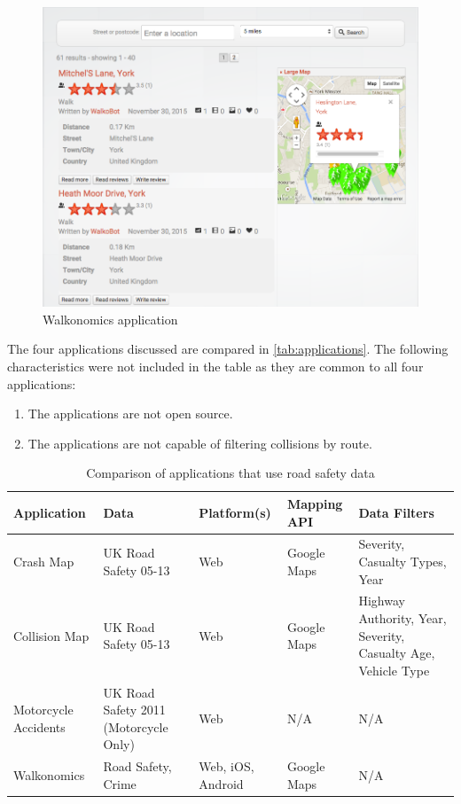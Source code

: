 \documentclass[authoryearcitations]{UoYCSproject}
\begin{document}
\begin{figure}
	\center
	\includegraphics[scale=0.4]{walkonomics}
	\caption{Walkonomics application}
	\label{fig:walkonomics}
\end{figure}

The four applications discussed are compared in \autoref{tab:applications}. The following characteristics were not included in the table as they are common to all four applications:

\begin{enumerate}
  \item The applications are not open source.
  \item The applications are not capable of filtering collisions by route.
\end{enumerate}

\begin{table}[tbp]
	\center
   \caption{Comparison of applications that use road safety data}
  \begin{tabular}{  p{2.2cm}   p{3.0cm} p{2.2cm}  p{2.0cm} p{3.5cm}  }
  	\hline
      \textbf{Application} & \textbf{Data} & \textbf{Platform(s)} & \textbf{Mapping API} & \textbf{Data Filters} \\ \hline
    Crash Map & UK Road Safety 05-13 & Web & Google Maps & Severity, Casualty Types, Year\\ 
	Collision Map & UK Road Safety 05-13 & Web & Google Maps & Highway Authority, Year, Severity, Casualty Age, Vehicle Type\\ 
	Motorcycle Accidents & UK Road Safety 2011 (Motorcycle Only) & Web & N/A & N/A\\ 
	Walkonomics & Road Safety, Crime & Web, iOS, Android & Google Maps & N/A\\ \hline
  \end{tabular}
  \label{tab:applications}
\end{table}
\end{document}
